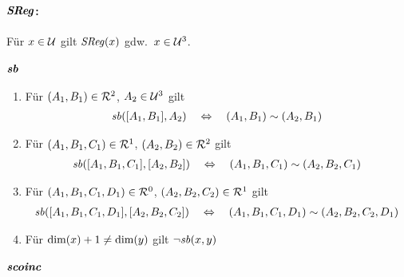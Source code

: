     
\paragraph{$\boldsymbol{\mathit{S\hspace*{-0.25ex}Reg}}$:}
Für $x \in \mathcal{U}$ gilt $\mathit{S\hspace*{-0.25ex}Reg}(x)$ gdw.\ $x\in \mathcal{U}^3$.


\paragraph{$\boldsymbol{\mathit{sb}}$}
%
    \begin{enumerate}
        \item Für $(A_1,B_1) \in \mathcal{R}^2$, $A_2 \in \mathcal{U}^3$ gilt 
            \begin{align*}
                \mathit{sb}([A_1,B_1],A_2) \quad \Leftrightarrow \quad (A_1,B_1) \sim (A_2,B_1)
            \end{align*}
        \item Für $(A_1,B_1,C_1) \in \mathcal{R}^1$, $(A_2,B_2) \in \mathcal{R}^2$ gilt 
            \begin{align*}
                \mathit{sb}([A_1,B_1,C_1],[A_2,B_2]) \quad 
                \Leftrightarrow  \quad (A_1,B_1,C_1) \sim (A_2,B_2,C_1)
            \end{align*}
        \item Für $(A_1,B_1,C_1,D_1) \in \mathcal{R}^0$, $(A_2,B_2,C_2) \in \mathcal{R}^1$ gilt 
            \begin{align*}
                \mathit{sb}([A_1,B_1,C_1,D_1],[A_2,B_2,C_2]) \quad 
                \Leftrightarrow  \quad (A_1,B_1,C_1,D_1) \sim (A_2,B_2,C_2,D_1)
            \end{align*}
        \item Für $\text{dim}(x) + 1 \neq \text{dim}(y)$ gilt $\neg \mathit{sb}(x,y)$
    \end{enumerate}
    
    
\paragraph{$\boldsymbol{\mathit{scoinc}}$}

